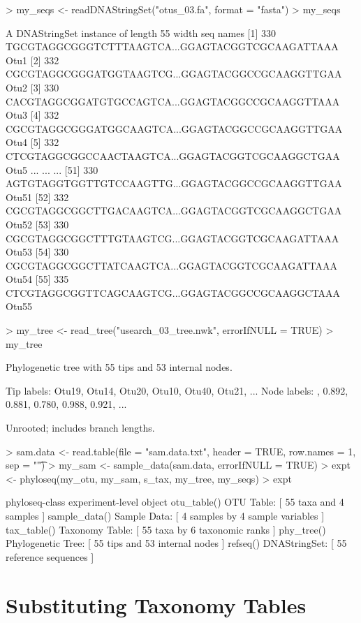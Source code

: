 \documentclass{article}
\begin{document}
\begin{Schunk}
\begin{Sinput}
> my_seqs <- readDNAStringSet("otus_03.fa", format = "fasta")
> my_seqs
\end{Sinput}
\begin{Soutput}
  A DNAStringSet instance of length 55
     width seq                                              names               
 [1]   330 TGCGTAGGCGGGTCTTTAAGTCA...GGAGTACGGTCGCAAGATTAAA Otu1
 [2]   332 CGCGTAGGCGGGATGGTAAGTCG...GGAGTACGGCCGCAAGGTTGAA Otu2
 [3]   330 CACGTAGGCGGATGTGCCAGTCA...GGAGTACGGCCGCAAGGTTAAA Otu3
 [4]   332 CGCGTAGGCGGGATGGCAAGTCA...GGAGTACGGCCGCAAGGTTGAA Otu4
 [5]   332 CTCGTAGGCGGCCAACTAAGTCA...GGAGTACGGTCGCAAGGCTGAA Otu5
 ...   ... ...
[51]   330 AGTGTAGGTGGTTGTCCAAGTTG...GGAGTACGGCCGCAAGGTTGAA Otu51
[52]   332 CGCGTAGGCGGCTTGACAAGTCA...GGAGTACGGTCGCAAGGCTGAA Otu52
[53]   330 CGCGTAGGCGGCTTTGTAAGTCG...GGAGTACGGTCGCAAGATTAAA Otu53
[54]   330 CGCGTAGGCGGCTTATCAAGTCA...GGAGTACGGTCGCAAGATTAAA Otu54
[55]   335 CTCGTAGGCGGTTCAGCAAGTCG...GGAGTACGGCCGCAAGGCTAAA Otu55
\end{Soutput}
\begin{Sinput}
> my_tree <- read_tree("usearch_03_tree.nwk", errorIfNULL = TRUE)
> my_tree
\end{Sinput}
\begin{Soutput}
Phylogenetic tree with 55 tips and 53 internal nodes.

Tip labels:
	Otu19, Otu14, Otu20, Otu10, Otu40, Otu21, ...
Node labels:
	, 0.892, 0.881, 0.780, 0.988, 0.921, ...

Unrooted; includes branch lengths.
\end{Soutput}
\begin{Sinput}
> sam.data <- read.table(file = "sam.data.txt", header = TRUE, row.names = 1, sep = "\t")
> my_sam <- sample_data(sam.data, errorIfNULL = TRUE)
> expt <- phyloseq(my_otu, my_sam, s_tax, my_tree, my_seqs)
> expt
\end{Sinput}
\begin{Soutput}
phyloseq-class experiment-level object
otu_table()   OTU Table:         [ 55 taxa and 4 samples ]
sample_data() Sample Data:       [ 4 samples by 4 sample variables ]
tax_table()   Taxonomy Table:    [ 55 taxa by 6 taxonomic ranks ]
phy_tree()    Phylogenetic Tree: [ 55 tips and 53 internal nodes ]
refseq()      DNAStringSet:      [ 55 reference sequences ]
\end{Soutput}
\end{Schunk}

\section*{Substituting Taxonomy Tables}
\end{document}
